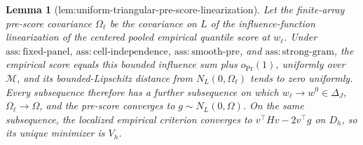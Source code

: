 \documentclass{article}
\newtheorem{lemma}{Lemma}
\begin{document}
\begin{lemma}[lem:uniform-triangular-pre-score-linearization]\label{lem:uniform-triangular-pre-score-linearization}
Let the finite-array pre-score covariance \(\Omega_\ell\) be the covariance on \(L\) of the influence-function linearization of the centered pooled empirical quantile score at \(w_\ell\).  Under \(\mathrm{ass:fixed\mbox{-}panel}\), \(\mathrm{ass:cell\mbox{-}independence}\), \(\mathrm{ass:smooth\mbox{-}pre}\), and \(\mathrm{ass:strong\mbox{-}gram}\), the empirical score equals this bounded influence sum plus \(o_{\Pr}(1)\), uniformly over \(\mathcal M\), and its bounded-Lipschitz distance from \(N_L(0,\Omega_\ell)\) tends to zero uniformly.  Every subsequence therefore has a further subsequence on which \(w_\ell\to w^0\in\Delta_J\), \(\Omega_\ell\to\Omega\), and the pre-score converges to \(g\sim N_L(0,\Omega)\).  On the same subsequence, the localized empirical criterion converges to \(v^\top Hv-2v^\top g\) on \(D_h\), so its unique minimizer is \(V_h\).
\end{lemma}
\end{document}
